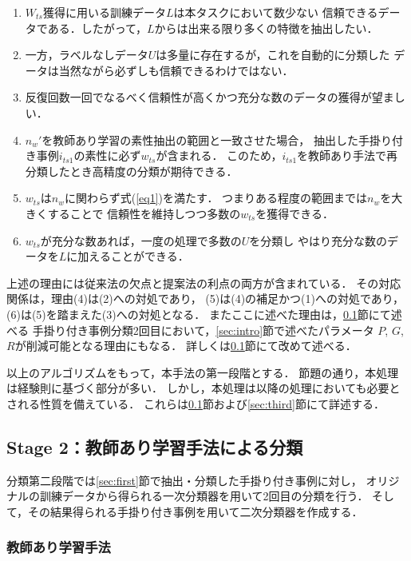 \documentclass[japanese]{jnlp_1.4}
\begin{document}
\begin{enumerate}
\item $W_{ts}$獲得に用いる訓練データ$L$は本タスクにおいて数少ない
信頼できるデータである．したがって，$L$からは出来る限り多くの特徴を抽出したい．
\item 一方，ラベルなしデータ$U$は多量に存在するが，これを自動的に分類した
データは当然ながら必ずしも信頼できるわけではない．
\item 反復回数一回でなるべく信頼性が高くかつ充分な数のデータの獲得が望ましい．
\item $n_w'$を教師あり学習の素性抽出の範囲と一致させた場合，
抽出した手掛り付き事例$i_{ts1}$の素性に必ず$w_{ts}$が含まれる．
このため，$i_{ts1}$を教師あり手法で再分類したとき高精度の分類が期待できる．
\item $w_{ts}$は$n_w$に関わらず式(\ref{eq1})を満たす．
つまりある程度の範囲までは$n_w$を大きくすることで
信頼性を維持しつつ多数の$w_{ts}$を獲得できる．
\item $w_{ts}$が充分な数あれば，一度の処理で多数の$U$を分類し
やはり充分な数のデータを$L$に加えることができる．
\end{enumerate}

上述の理由には従来法の欠点と提案法の利点の両方が含まれている．
その対応関係は，理由(4)は(2)への対処であり，
(5)は(4)の補足かつ(1)への対処であり，(6)は(5)を踏まえた(3)への対処となる．
またここに述べた理由は，\ref{sec:second}節にて述べる
手掛り付き事例分類2回目において，\ref{sec:intro}節で述べたパラメータ
$P$, $G$, $R$が削減可能となる理由にもなる．
詳しくは\ref{sec:second}節にて改めて述べる．

以上のアルゴリズムをもって，本手法の第一段階とする．
節題の通り，本処理は経験則に基づく部分が多い．
しかし，本処理は以降の処理においても必要とされる性質を備えている．
これらは\ref{sec:second}節および\ref{sec:third}節にて詳述する．


\subsection{Stage 2：教師あり学習手法による分類}
\label{sec:second}

分類第二段階では\ref{sec:first}節で抽出・分類した手掛り付き事例に対し，
オリジナルの訓練データから得られる一次分類器を用いて2回目の分類を行う．
そして，その結果得られる手掛り付き事例を用いて二次分類器を作成する．


\subsubsection{教師あり学習手法}
\end{document}
